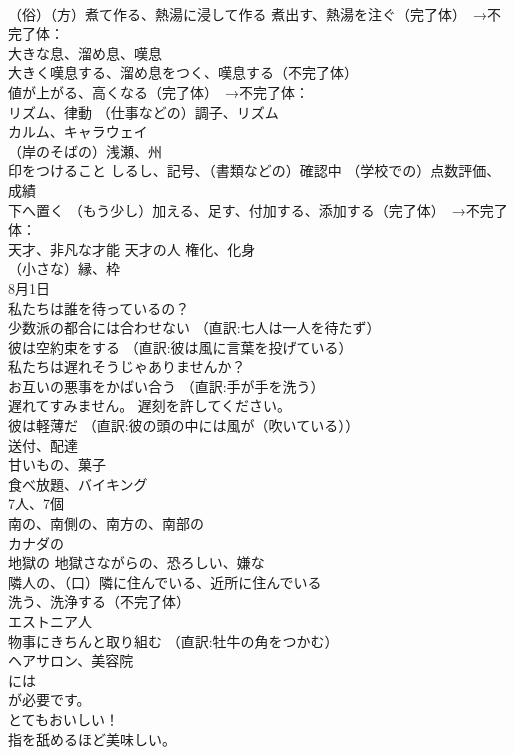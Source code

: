 \documentclass[8pt]{extreport}
\begin{document}
\begin{CJK}{UTF8}{min}
\\	（俗）（方）煮て作る、熱湯に浸して作る 煮出す、熱湯を注ぐ（完了体）　→不完了体：
\\	大きな息、溜め息、嘆息
\\	大きく嘆息する、溜め息をつく、嘆息する（不完了体）
\\	値が上がる、高くなる（完了体）　→不完了体：
\\	リズム、律動 （仕事などの）調子、リズム
\\	カルム、キャラウェイ
\\	（岸のそばの）浅瀬、州
\\	印をつけること しるし、記号、（書類などの）確認中 （学校での）点数評価、成績
\\	下へ置く （もう少し）加える、足す、付加する、添加する（完了体）　→不完了体：
\\	天才、非凡な才能 天才の人 権化、化身
\\	（小さな）縁、枠
\\	8月1日
\\	私たちは誰を待っているの？
\\	少数派の都合には合わせない （直訳:七人は一人を待たず）
\\	彼は空約束をする （直訳:彼は風に言葉を投げている）
\\	私たちは遅れそうじゃありませんか？
\\	お互いの悪事をかばい合う （直訳:手が手を洗う）
\\	遅れてすみません。 遅刻を許してください。
\\	彼は軽薄だ （直訳:彼の頭の中には風が（吹いている））
\\	送付、配達
\\	甘いもの、菓子
\\	食べ放題、バイキング
\\	[集合]7人、7個
\\	南の、南側の、南方の、南部の
\\	カナダの
\\	地獄の 地獄さながらの、恐ろしい、嫌な
\\	隣人の、（口）隣に住んでいる、近所に住んでいる
\\	洗う、洗浄する（不完了体） 
\\	エストニア人
\\	物事にきちんと取り組む （直訳:牡牛の角をつかむ）
\\	ヘアサロン、美容院
\\	には
\\	が必要です。
\\	とてもおいしい！
\\	指を舐めるほど美味しい。

\end{CJK}
\end{document}
